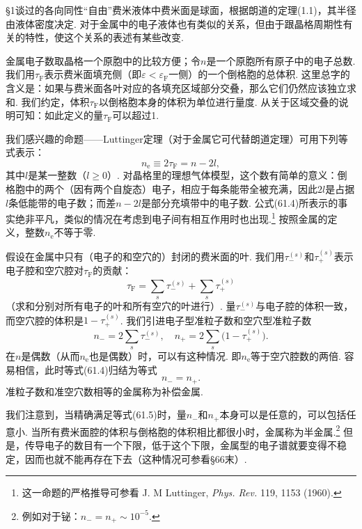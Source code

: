 §1谈过的各向同性“自由”费米液体中费米面是球面，根据朗道的定理(1.1)，其半径由液体密度决定. 对于金属中的电子液体也有类似的关系，但由于跟晶格周期性有关的特性，使这个关系的表述有某些改变.

金属电子数取晶格一个原胞中的比较方便；令$n$是一个原胞所有原子中的电子总数. 我们用$\tau_{\mathrm F}$表示费米面填充侧（即$\varepsilon<\varepsilon_{\mathrm F}$一侧）的一个倒格胞的总体积. 这里总字的含义是：如果与费米面各叶对应的各填充区域部分交叠，那么它们仍然应该独立求和. 我们约定，体积$\tau_{\mathrm F}$以倒格胞本身的体积为单位进行量度. 从关于区域交叠的说明可知：如此定义的量$\tau_{\mathrm F}$可以超过1.

我们感兴趣的命题——Luttinger定理（对于金属它可代替朗道定理）可用下列等式表示：
\begin{equation}
n_{\mathrm e}\equiv2\tau_{\mathrm F}=n-2l,
\label{61.4}
\end{equation}
其中$l$是某一整数（$l\geqslant0$）. 对晶格里的理想气体模型，这个数有简单的意义：倒格胞中的两个（因有两个自旋态）电子，相应于每条能带全被充满，因此$2l$是占据$l$条低能带的电子数；而差$n-2l$是部分充填带中的电子数. 公式(61.4)所表示的事实绝非平凡，类似的情况在考虑到电子间有相互作用时也出现.\footnote{这一命题的严格推导可参看 J. M Luttinger, \emph{Phys. Rev.} 119, 1153 (1960).} 按照金属的定义，整数$n_{\mathrm e}$不等于零.

假设在金属中只有（电子的和空穴的）封闭的费米面的叶. 我们用$\tau^{(s)}_-$和$\tau^{(s)}_+$表示电子腔和空穴腔对$\tau_{\mathrm F}$的贡献：
\begin{equation*}
\tau_{\mathrm F}=\sum_s\tau^{(s)}_-+\sum_s\tau^{(s)}_+
\end{equation*}
（求和分别对所有电子的叶和所有空穴的叶进行）. 量$\tau^{(s)}_-$与电子腔的体积一致，而空穴腔的体积是$1-\tau^{(s)}_+$. 我们引进电子型准粒子数和空穴型准粒子数
\begin{equation*}
n_-=2\sum_s\tau^{(s)}_-,\quad n_+=2\sum_s\bigl(1-\tau^{(s)}_+\bigr).
\end{equation*}
在$n$是偶数（从而$n_{\mathrm e}$也是偶数）时，可以有这种情况. 即$n_{\mathrm e}$等于空穴腔数的两倍. 容易相信，此时等式(61.4)归结为等式
\begin{equation}
n_-=n_+.
\label{61.5}
\end{equation}
准粒子数和准空穴数相等的金属称为补偿金属.

我们注意到，当精确满足等式(61.5)时，量$n_-$和$n_+$本身可以是任意的，可以包括任意小. 当所有费米面腔的体积与倒格胞的体积相比都很小时，金属称为半金属.\footnote{例如对于铋：$n_-=n_+\sim10^{-5}$.} 但是，传导电子的数目有一个下限，低于这个下限，金属型的电子谱就要变得不稳定，因而也就不能再存在下去（这种情况可参看§66末）.

